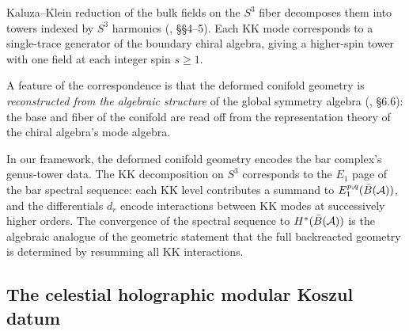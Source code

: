 \begin{proposition}
\label{prop:kk-tower-s3}
Kaluza--Klein reduction of the bulk fields on the $S^3$ fiber
decomposes them into towers indexed by $S^3$ harmonics
\textup{(}\!\cite{CG18}, \S\S4--5\textup{)}. Each KK mode corresponds
to a single-trace generator of the boundary chiral algebra, giving a
higher-spin tower with one field at each integer spin $s \geq 1$.
\end{proposition}

\begin{remark}
\label{rem:geometry-from-algebra}
A feature of the correspondence is that the deformed conifold
geometry is \emph{reconstructed from the algebraic structure} of the
global symmetry algebra \textup{(}\!\cite{CG18}, \S6.6\textup{)}: the
base and fiber of the conifold are read off from the representation
theory of the chiral algebra's mode algebra.
\end{remark}

\begin{remark}
\label{rem:conifold-bar-spectral}
In our framework, the deformed conifold geometry encodes the bar
complex's genus-tower data. The KK decomposition on $S^3$ corresponds
to the $E_1$ page of the bar spectral sequence: each KK level
contributes a summand to $E_1^{p,q}(\bar{B}(\mathcal A))$, and the
differentials $d_r$ encode interactions between KK modes at successively
higher orders. The convergence of the spectral sequence to
$H^*(\bar{B}(\mathcal A))$ is the algebraic analogue of the geometric statement
that the full backreacted geometry is determined by resumming all
KK interactions.
\end{remark}

\subsection{The celestial holographic modular Koszul datum}
\label{subsec:celestial-hmkd}

